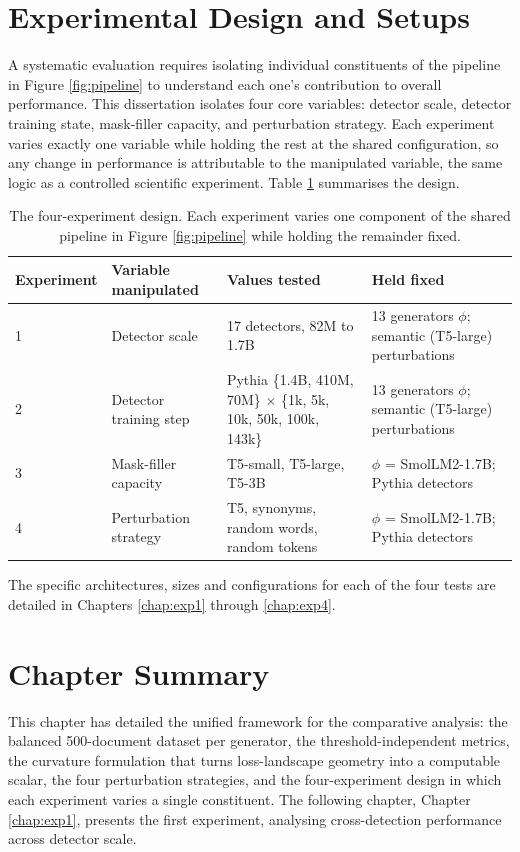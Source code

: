 \documentclass[logo,msc,cs]{infthesis}      %
\begin{document}
\section{Experimental Design and Setups}
\label{sec:experimental_design}
A systematic evaluation requires isolating individual constituents of the pipeline in Figure \ref{fig:pipeline} to understand each one's contribution to overall performance. This dissertation isolates four core variables: detector scale, detector training state, mask-filler capacity, and perturbation strategy. Each experiment varies exactly one variable while holding the rest at the shared configuration, so any change in performance is attributable to the manipulated variable, the same logic as a controlled scientific experiment. Table \ref{tab:design} summarises the design.
\begin{table}[H]
\centering
\small
\caption{The four-experiment design. Each experiment varies one component of the shared pipeline in Figure \ref{fig:pipeline} while holding the remainder fixed.}
\label{tab:design}
\begin{tabularx}{\textwidth}{@{} l l X X @{}}
\hline
Experiment & Variable manipulated & Values tested & Held fixed \\
\hline
1 & Detector scale & 17 detectors, 82M to 1.7B & 13 generators $\phi$; semantic (T5-large) perturbations \\
2 & Detector training step & Pythia \{1.4B, 410M, 70M\} $\times$ \{1k, 5k, 10k, 50k, 100k, 143k\} & 13 generators $\phi$; semantic (T5-large) perturbations \\
3 & Mask-filler capacity & T5-small, T5-large, T5-3B & $\phi$ = SmolLM2-1.7B; Pythia detectors \\
4 & Perturbation strategy & T5, synonyms, random words, random tokens & $\phi$ = SmolLM2-1.7B; Pythia detectors \\
\hline
\end{tabularx}
\end{table}
The specific architectures, sizes and configurations for each of the four tests are detailed in Chapters \ref{chap:exp1} through \ref{chap:exp4}.

\section{Chapter Summary}
\label{sec:methodology_summary}
This chapter has detailed the unified framework for the comparative analysis: the balanced 500-document dataset per generator, the threshold-independent metrics, the curvature formulation that turns loss-landscape geometry into a computable scalar, the four perturbation strategies, and the four-experiment design in which each experiment varies a single constituent. The following chapter, Chapter \ref{chap:exp1}, presents the first experiment, analysing cross-detection performance across detector scale.
\end{document}
